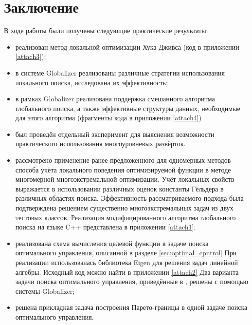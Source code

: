 \section{Заключение}
В ходе работы были получены следующие практические результаты:
\begin{itemize}
  \item реализован метод локальной оптимизации Хука-Дживса (код в приложении \ref{attach3});
  \item в системе Globalizer реализованы различные стратегии использования локального поиска,
  исследована их эффективность;
  \item в рамках Globalizer реализована поддержка смешанного алгоритма глобального поиска,
  а также эффективные структуры данных, необходимые для этого алгоритма (фрагменты кода в приложении \ref{attach4})
  \item был проведён отдельный эксперимент для выяснения возможности практического использования многоуровневых развёрток.
  \item рассмотрено применение ранее предложенного для одномерных методов способа учёта
  локального поведения оптимизируемой функции в методе многомерной многоэкстремальной
  оптимизации. Учёт локальных свойств выражается в использовании различных оценок
  константы Гёльдера в различных областях поиска. Эффективность рассматриваемого подхода
  была подтверждена решением существенно многоэкстремальных задач из двух тестовых классов.
  Реализация модифицированного алгоритма глобального поиска на языке C++ представлена
  в приложении \ref{attach1};
  \item реализована схема вычисления целевой функции в задаче поиска оптимального управления,
  описанной в разделе \ref{sec:optimal_cpntrol}
  При реализации использовалась библиотека Eigen \cite{eigenLib} для решения задач
  линейной алгебры. Исходный код можно найти в приложении \ref{attach2}
  Два варианта задачи поиска оптимального управления,
  приведённые в \cite{optControl}, решены с помощью системы Globalizer;
  \item решена прикладная задача построения Парето-границы в одной задаче поиска оптимального
  управления.
\end{itemize}
